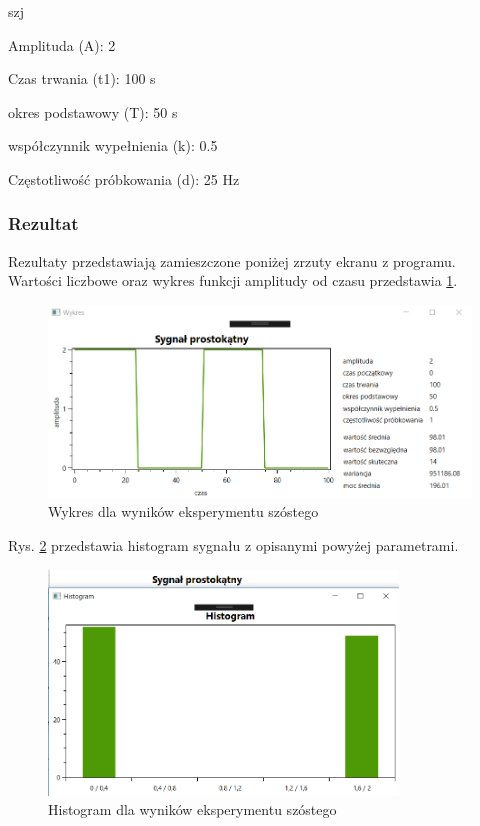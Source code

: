 \documentclass[12pt]{article}
\begin{document}
\begin{labeling}{szj}
\item [Amplituda (A):] 2
\item [Czas trwania (t1):] 100 s
\item [okres podstawowy (T):] 50 s
\item [współczynnik wypełnienia (k):] 0.5
\item [Częstotliwość próbkowania (d): ] 25 Hz
\end{labeling}

\subsubsection{Rezultat}
Rezultaty przedstawiają zamieszczone poniżej zrzuty ekranu z programu. Wartości liczbowe oraz wykres funkcji amplitudy od czasu przedstawia \ref{Wykres dla wyników eksperymentu szóstego}.

\begin{figure}[h!]
 \centering
 \includegraphics[width=12.3cm]{SygProst.PNG}
 \vspace{-0.3cm}
 \caption{Wykres dla wyników eksperymentu szóstego}
 \label{Wykres dla wyników eksperymentu szóstego}
\end{figure}
\newpage
Rys. \ref{Histogram dla wyników eksperymentu szóstego} przedstawia histogram sygnału z opisanymi powyżej parametrami. 
\begin{figure}[h!]
 \centering
 \includegraphics[width=9.3cm]{SygProstHist.PNG}
 \vspace{-0.3cm}
 \caption{Histogram dla wyników eksperymentu szóstego}
 \label{Histogram dla wyników eksperymentu szóstego}
\end{figure}
\end{document}
